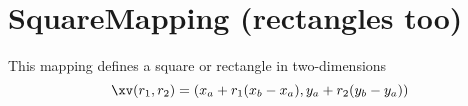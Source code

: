 \section{SquareMapping (rectangles too)}

 This mapping defines a square or rectangle in two-dimensions
\[
  \xv(r_1,r_2) = ( x_a + r_1(x_b-x_a) , y_a + r_2(y_b-y_a) )
\]


